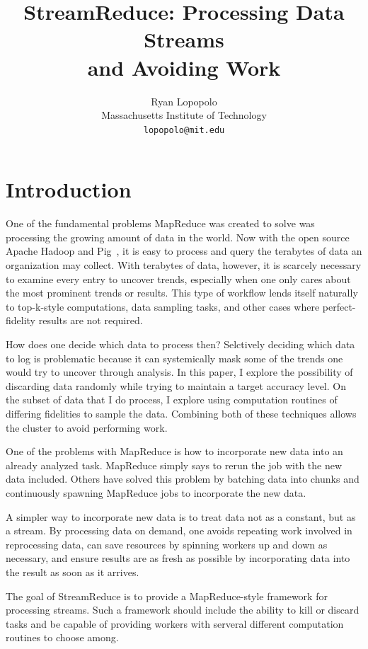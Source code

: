 \documentclass[12pt,twocolumn]{article}
\title{StreamReduce: Processing Data Streams\\and Avoiding Work}
\author{Ryan Lopopolo\\
Massachusetts Institute of Technology\\
\texttt{lopopolo@mit.edu}}
\begin{document}
\maketitle

\section{Introduction}
\label{sec:intro}
One of the fundamental problems MapReduce was created to solve was processing
the growing amount of data in the world. Now with the open source Apache Hadoop
and Pig~\cite{Olston:2008:PLN:1376616.1376726}, it is easy to process and query
the terabytes of data an organization
may collect. With terabytes of data, however, it is scarcely necessary to examine
every entry to uncover trends, especially when one only cares about the most prominent
trends or results. This type of workflow lends itself naturally to top-k-style computations,
data sampling tasks, and other cases where perfect-fidelity results are not required.

How does one decide which data to process then? Selctively deciding which data to
log is problematic because it can systemically mask some of the trends one would
try to uncover through analysis. In this paper, I explore the possibility of
discarding data randomly while trying to maintain a target accuracy level.
On the subset of data that I do process, I explore using
computation routines of differing fidelities to sample the data. Combining both of these
techniques allows the cluster to avoid performing work.

One of the problems with MapReduce is how to
incorporate new data into an already analyzed task. MapReduce simply says to rerun
the job with the new data included. Others have solved this problem by batching data
into chunks and continuously spawning MapReduce jobs to incorporate the new data.

A simpler way to incorporate new data is to treat data not as a constant, but as a
stream. By processing data on demand, one avoids repeating work involved in reprocessing
data, can save resources
by spinning workers up and down as necessary, and ensure results are as fresh as possible
by incorporating data into the result as soon as it arrives.

The goal of StreamReduce is to provide a MapReduce-style framework for processing streams. Such a
framework should include the ability to kill or discard tasks and be capable of
providing workers with serveral different computation routines to choose among.
\end{document}
